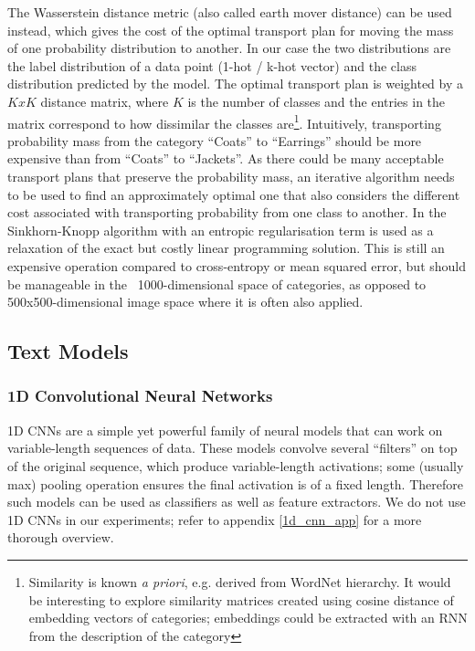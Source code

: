 The Wasserstein distance metric (also called earth mover distance) can be used instead, which gives the cost of the optimal transport plan for moving the mass of one probability distribution to another.
In our case the two distributions are the label distribution of a data point (1-hot / k-hot vector) and the class distribution predicted by the model.
The optimal transport plan is weighted by a $KxK$ distance matrix, where $K$ is the number of classes and the entries in the matrix correspond to how dissimilar the classes are\footnote{Similarity is known \textit{a priori}, e.g. derived from WordNet hierarchy. It would be interesting to explore similarity matrices created using cosine distance of embedding vectors of categories; embeddings could be extracted with an RNN from the description of the category}.
Intuitively, transporting probability mass from the category ``Coats'' to ``Earrings'' should be more expensive than from ``Coats'' to ``Jackets''.
As there could be many acceptable transport plans that preserve the probability mass, an iterative algorithm needs to be used to find an approximately optimal one that also considers the different cost associated with transporting probability from one class to another.
In \cite{wasserstein_loss} the Sinkhorn-Knopp algorithm with an entropic regularisation term is used as a relaxation of the exact but costly linear programming solution.
This is still an expensive operation compared to cross-entropy or mean squared error, but should be manageable in the ~1000-dimensional space of categories, as opposed to 500x500-dimensional image space where it is often also applied.


\subsection{Text Models}
\label{text_models}

\subsubsection{1D Convolutional Neural Networks}

1D CNNs are a simple yet powerful family of neural models that can work on variable-length sequences of data.
These models convolve several ``filters'' on top of the original sequence, which produce variable-length activations; some (usually max) pooling operation ensures the final activation is of a fixed length.
Therefore such models can be used as classifiers as well as feature extractors.
We do not use 1D CNNs in our experiments; refer to appendix \ref{1d_cnn_app} for a more thorough overview.


